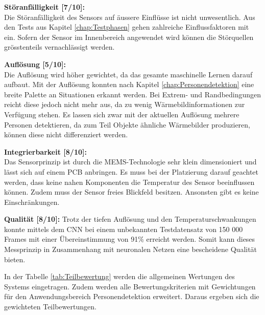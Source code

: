 \textbf{Störanfälligkeit [7/10]:} \\
Die Störanfälligkeit des Sensors auf äussere Einflüsse ist nicht unwesentlich. Aus den Tests aus Kapitel \ref{chap:Testphasen} gehen zahlreiche Einflussfaktoren mit ein. Sofern der Sensor im Innenbereich angewendet wird können die Störquellen grösstenteils vernachlässigt werden.

\textbf{Auflösung [5/10]:} \\
Die Auflösung wird höher gewichtet, da das gesamte maschinelle Lernen darauf aufbaut. Mit der Auflösung konnten nach Kapitel \ref{chap:Personendetektion} eine breite Palette an Situationen erkannt werden. Bei Extrem- und Randbedingungen reicht diese jedoch nicht mehr aus, da zu wenig Wärmebildinformationen zur Verfügung stehen. Es lassen sich zwar mit der aktuellen Auflösung mehrere Personen detektieren, da zum Teil Objekte ähnliche Wärmebilder produzieren, können diese nicht differenziert werden.  

\textbf{Integrierbarkeit [8/10]:} \\
Das Sensorprinzip ist durch die MEMS-Technologie sehr klein dimensioniert und lässt sich auf einem \ac{PCB} anbringen. Es muss bei der Platzierung darauf geachtet werden, dass keine nahen Komponenten die Temperatur des Sensor beeinflussen können. Zudem muss der Sensor freies Blickfeld besitzen. Ansonsten gibt es keine Einschränkungen. 

\textbf{Qualität [8/10]:}
Trotz der tiefen Auflösung und den Temperaturschwankungen konnte mittels dem \ac{CNN} bei einem unbekannten Testdatensatz von 150 000 Frames mit einer Übereinstimmung von 91\% erreicht werden. Somit kann dieses Messprinzip in Zusammenhang mit neuronalen Netzen eine bescheidene Qualität bieten.

In der Tabelle \ref{tab:Teilbewertung} werden die allgemeinen Wertungen des Systems eingetragen. Zudem werden alle Bewertungskriterien mit Gewichtungen für den Anwendungsbereich Personendetektion erweitert. Daraus ergeben sich die gewichteten Teilbewertungen.

